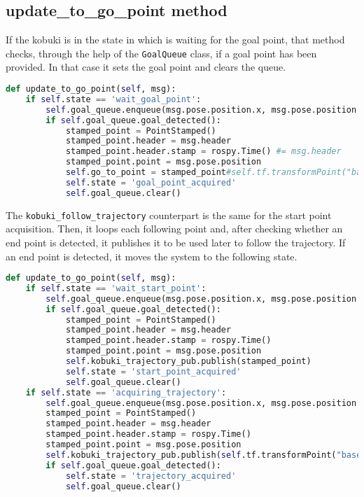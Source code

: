 \subsection*{update\_to\_go\_point method}
If the kobuki is in the state in which is waiting for the goal point, that method checks, through the help of the \texttt{GoalQueue} class, if a goal point has been provided. In that case it sets the goal point and clears the queue.
\begin{lstlisting}[caption={Update To Go Point},label={lst:updatetogopoint},language=Python]
def update_to_go_point(self, msg):
    if self.state == 'wait_goal_point':
        self.goal_queue.enqueue(msg.pose.position.x, msg.pose.position.y)
        if self.goal_queue.goal_detected():
            stamped_point = PointStamped()
            stamped_point.header = msg.header
            stamped_point.header.stamp = rospy.Time() #= msg.header
            stamped_point.point = msg.pose.position
            self.go_to_point = stamped_point#self.tf.transformPoint("base_link", stamped_point)
            self.state = 'goal_point_acquired'
            self.goal_queue.clear()
\end{lstlisting}
The \texttt{kobuki\_follow\_trajectory} counterpart is the same for the start point acquisition. Then, it loops each following point and, after checking whether an end point is detected, it publishes it to be used later to follow the trajectory. If an end point is detected, it moves the system to the following state.
\begin{lstlisting}[caption={Update To Go Point},label={lst:updatetogopoint2},language=Python]
def update_to_go_point(self, msg):
    if self.state == 'wait_start_point':
        self.goal_queue.enqueue(msg.pose.position.x, msg.pose.position.y)
        if self.goal_queue.goal_detected():
            stamped_point = PointStamped()
            stamped_point.header = msg.header
            stamped_point.header.stamp = rospy.Time()
            stamped_point.point = msg.pose.position
            self.kobuki_trajectory_pub.publish(stamped_point)
            self.state = 'start_point_acquired'
            self.goal_queue.clear()
    if self.state == 'acquiring_trajectory':
        self.goal_queue.enqueue(msg.pose.position.x, msg.pose.position.y)
        stamped_point = PointStamped()
        stamped_point.header = msg.header
        stamped_point.header.stamp = rospy.Time()
        stamped_point.point = msg.pose.position
        self.kobuki_trajectory_pub.publish(self.tf.transformPoint("base_link", stamped_point))
        if self.goal_queue.goal_detected():
            self.state = 'trajectory_acquired'
            self.goal_queue.clear()
\end{lstlisting}
